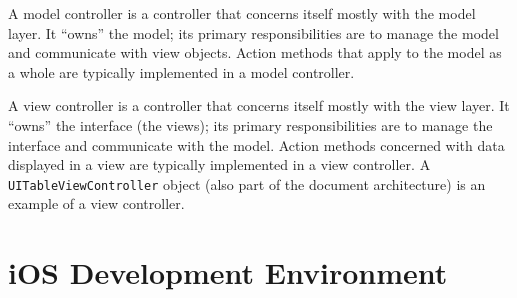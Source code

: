 A model controller is a controller that concerns itself mostly with the model
layer. It “owns” the model; its primary responsibilities are to manage the model
and communicate with view objects. Action methods that apply to the model as a
whole are typically implemented in a model controller.

A view controller is a controller that concerns itself mostly with the view
layer. It “owns” the interface (the views); its primary responsibilities are to
manage the interface and communicate with the model. Action methods concerned
with data displayed in a view are typically implemented in a view controller. A
\texttt{UITableViewController} object (also part of the document architecture)
is an example of a view controller.

\section{iOS Development Environment}
\label{sect:ios_dev_env}
